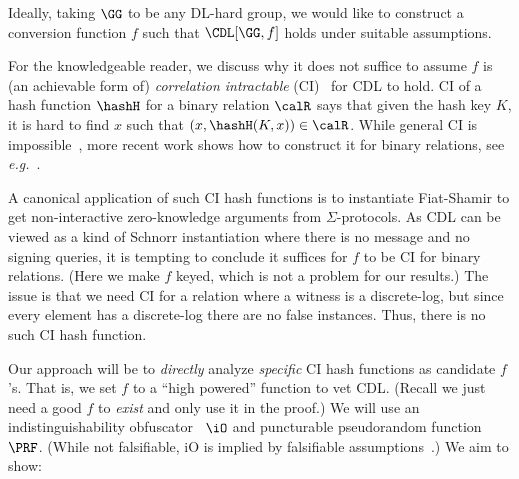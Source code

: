 Ideally, taking $\GG$ to be any DL-hard group, we would like to construct a conversion function $f$ such that $\CDL[\GG,f]$ holds under suitable assumptions.

   For the knowledgeable reader, we discuss why it does not suffice to assume $f$ is  (an achievable form of) \emph{correlation intractable} (CI)~\cite{JACM:CanGolHal04} for CDL to hold. CI of a hash function $\hashH$ for a binary relation $\calR$ says that given the hash key $K$, it is hard to find $x$  such that $(x,\hashH(K,x)) \in \calR$. While general  CI  is impossible~\cite{JACM:CanGolHal04}, more recent work shows how to construct it for binary relations, see \emph{e.g.}~\cite{STOC:CCHLRRW19,EC:CCRR18,TCC:CanCheRey16}.

A canonical application of such CI hash functions is to instantiate Fiat-Shamir to get non-interactive zero-knowledge arguments from  $\Sigma$-protocols. As CDL can be  viewed  as a kind of  Schnorr instantiation  where there is no message and no signing queries, it  is tempting to conclude it suffices  for $f$ to be CI for  binary relations. (Here we  make $f$ keyed, which is not a problem for our results.) The issue is that we need CI  for a relation where a witness is a discrete-log, but since every element has a discrete-log there are no false instances. %
Thus,  there is no such CI hash function. 


 Our approach will be to \emph{directly} analyze  \emph{specific}  CI hash functions as candidate $f$'s.  That is, we set $f$  to a ``high powered'' function to vet CDL. (Recall we just need a good $f$ to \emph{exist} and only use it in the proof.)  We will use an indistinguishability obfuscator~\cite{C:BGIRSVY01,SIAM:BGIRSVH16}  $\iO$ and puncturable pseudorandom function~\cite{AC:BonWat13,EC:BoyGilIsh15,CCS:KPTZ13}  $\PRF$. (While not falsifiable, iO is implied by falsifiable assumptions~\cite{STOC:JaiLinSah21,EC:JaiLinSah22}.) We aim to show:


